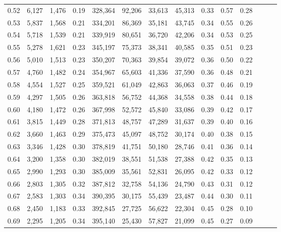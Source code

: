 \begin{tabular}{rrrrrrrrrrrrrr}
0.52 &   6,127 &  1,476 &  0.19 &  328,364 &   92,206 &  33,613 &  45,313 &  0.33 &  0.57 &      0.28 \\
0.53 &   5,837 &  1,568 &  0.21 &  334,201 &   86,369 &  35,181 &  43,745 &  0.34 &  0.55 &      0.26 \\
0.54 &   5,718 &  1,539 &  0.21 &  339,919 &   80,651 &  36,720 &  42,206 &  0.34 &  0.53 &      0.25 \\
0.55 &   5,278 &  1,621 &  0.23 &  345,197 &   75,373 &  38,341 &  40,585 &  0.35 &  0.51 &      0.23 \\
0.56 &   5,010 &  1,513 &  0.23 &  350,207 &   70,363 &  39,854 &  39,072 &  0.36 &  0.50 &      0.22 \\
0.57 &   4,760 &  1,482 &  0.24 &  354,967 &   65,603 &  41,336 &  37,590 &  0.36 &  0.48 &      0.21 \\
0.58 &   4,554 &  1,527 &  0.25 &  359,521 &   61,049 &  42,863 &  36,063 &  0.37 &  0.46 &      0.19 \\
0.59 &   4,297 &  1,505 &  0.26 &  363,818 &   56,752 &  44,368 &  34,558 &  0.38 &  0.44 &      0.18 \\
0.60 &   4,180 &  1,472 &  0.26 &  367,998 &   52,572 &  45,840 &  33,086 &  0.39 &  0.42 &      0.17 \\
0.61 &   3,815 &  1,449 &  0.28 &  371,813 &   48,757 &  47,289 &  31,637 &  0.39 &  0.40 &      0.16 \\
0.62 &   3,660 &  1,463 &  0.29 &  375,473 &   45,097 &  48,752 &  30,174 &  0.40 &  0.38 &      0.15 \\
0.63 &   3,346 &  1,428 &  0.30 &  378,819 &   41,751 &  50,180 &  28,746 &  0.41 &  0.36 &      0.14 \\
0.64 &   3,200 &  1,358 &  0.30 &  382,019 &   38,551 &  51,538 &  27,388 &  0.42 &  0.35 &      0.13 \\
0.65 &   2,990 &  1,293 &  0.30 &  385,009 &   35,561 &  52,831 &  26,095 &  0.42 &  0.33 &      0.12 \\
0.66 &   2,803 &  1,305 &  0.32 &  387,812 &   32,758 &  54,136 &  24,790 &  0.43 &  0.31 &      0.12 \\
0.67 &   2,583 &  1,303 &  0.34 &  390,395 &   30,175 &  55,439 &  23,487 &  0.44 &  0.30 &      0.11 \\
0.68 &   2,450 &  1,183 &  0.33 &  392,845 &   27,725 &  56,622 &  22,304 &  0.45 &  0.28 &      0.10 \\
0.69 &   2,295 &  1,205 &  0.34 &  395,140 &   25,430 &  57,827 &  21,099 &  0.45 &  0.27 &      0.09 \\

\end{tabular}

